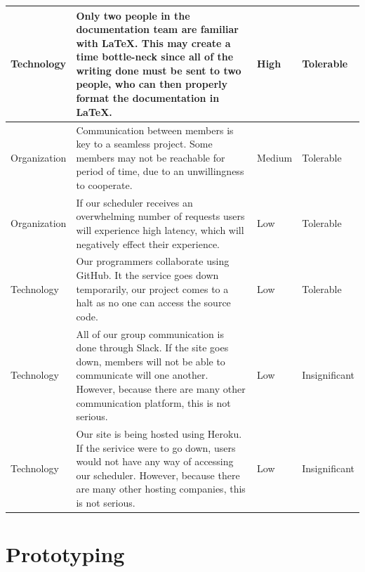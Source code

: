 \documentclass[12pt]{article}
\begin{document}
\begin{center}
\begin{longtable}{| p{2cm} | p{9cm} | p{2cm} | p{2cm} |}
Technology		&  Only two people in the documentation team are familiar with LaTeX. This may create a time bottle-neck since all of the writing done must be sent to two people, who can then properly format the documentation in LaTeX. & High & Tolerable\\ \hline
Organization  &  Communication between members is key to a seamless project. Some members may not be reachable for period of time, due to an unwillingness to cooperate. & Medium & Tolerable\\ \hline
Organization  &  If our scheduler receives an overwhelming number of requests users will experience high latency, which will negatively effect their experience. & Low & Tolerable\\ \hline
Technology		&  Our programmers collaborate using GitHub. It the service goes down temporarily, our project comes to a halt as no one can access the source code. & Low & Tolerable\\ \hline

Technology		&  All of our group communication is done through Slack. If the site goes down, members will not be able to communicate will one another. However, because there are many other communication platform, this is not serious. & Low & Insignificant \\ \hline
Technology		& Our site is being hosted using Heroku. If the serivice were to go down, users would not have any way of accessing our scheduler. However, because there are many other hosting companies, this is not serious.  & Low & Insignificant \\ \hline



\end{longtable}
\end{center}
%

\vfill
\newpage

\section{Prototyping}
\end{document}
